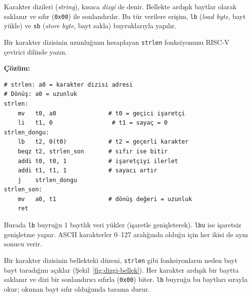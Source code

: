 Karakter dizileri (\emph{string}), kısaca \emph{dizgi} de denir. Bellekte ardışık baytlar olarak saklanır ve sıfır (\texttt{0x00}) ile sonlandırılır. Bu tür verilere erişim, \texttt{lb} (\emph{load byte}, bayt yükle) ve \texttt{sb} (\emph{store byte}, bayt sakla) buyruklarıyla yapılır.

\begin{ornek}[4.9]
\label{orn:strlen}
Bir karakter dizisinin uzunluğunu hesaplayan \texttt{strlen} fonksiyonunu RISC-V çevirici dilinde yazın.

\textbf{Çözüm:}

\begin{lstlisting}[style=riscv]
# strlen: a0 = karakter dizisi adresi
# Dönüş: a0 = uzunluk
strlen:
    mv   t0, a0               # t0 = geçici işaretçi
    li   t1, 0                 # t1 = sayaç = 0
strlen_dongu:
    lb   t2, 0(t0)            # t2 = geçerli karakter
    beqz t2, strlen_son       # sıfır ise bitir
    addi t0, t0, 1            # işaretçiyi ilerlet
    addi t1, t1, 1            # sayacı artır
    j    strlen_dongu
strlen_son:
    mv   a0, t1               # dönüş değeri = uzunluk
    ret
\end{lstlisting}

Burada \texttt{lb} buyruğu 1 baytlık veri yükler (işaretle genişleterek). \texttt{lbu} ise işaretsiz genişletme yapar. ASCII karakterler 0--127 aralığında olduğu için her ikisi de aynı sonucu verir.
\end{ornek}

Bir karakter dizisinin bellekteki düzeni, \texttt{strlen} gibi fonksiyonların neden bayt bayt taradığını açıklar (Şekil~\ref{fig:dizgi-bellek}). Her karakter ardışık bir baytta saklanır ve dizi bir sonlandırıcı sıfırla (\texttt{0x00}) biter. \texttt{lb} buyruğu bu baytları sırayla okur; okunan bayt sıfır olduğunda tarama durur.

